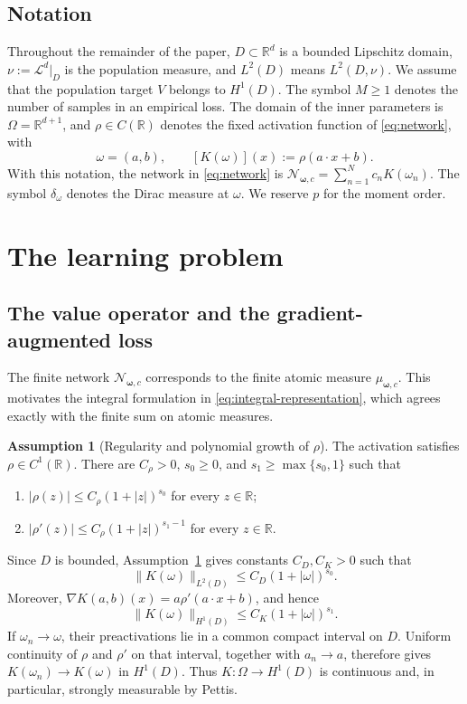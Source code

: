 \documentclass[11pt]{amsart}
\theoremstyle{definition}
\newtheorem{assumption}[theorem]{Assumption}
\theoremstyle{remark}
\begin{document}
\subsection*{Notation}
Throughout the remainder of the paper, $D\subset\mathbb R^d$ is a bounded
Lipschitz domain, $\nu:=\mathcal L^d|_D$ is the population measure,
and $L^2(D)$ means $L^2(D,\nu)$. We assume that the population target
$V$ belongs to $H^1(D)$. The symbol $M\ge1$ denotes the number of samples in
an empirical loss. The domain of the inner parameters is
$\Omega=\mathbb R^{d+1}$, and $\rho\in C(\mathbb R)$ denotes the fixed
activation function of \eqref{eq:network}, with
\begin{equation*}
	\omega=(a,b),\qquad [K(\omega)](x):=\rho(a\cdot x+b).
\end{equation*}
With this notation, the network in \eqref{eq:network} is
$\mathcal N_{\boldsymbol\omega,c}=\sum_{n=1}^Nc_nK(\omega_n)$.
The symbol $\delta_\omega$ denotes the Dirac measure at $\omega$. 
We reserve $p$ for the moment order.

\section{The learning problem}

\subsection{The value operator and the gradient-augmented loss}
The finite network $\mathcal N_{\boldsymbol\omega,c}$ corresponds to the
finite atomic measure $\mu_{\boldsymbol\omega,c}$. This motivates the integral
formulation in \eqref{eq:integral-representation}, which agrees exactly with the finite sum on atomic
measures.

\begin{assumption}[Regularity and polynomial growth of $\rho$]
\label{ass:value-growth}
The activation satisfies $\rho\in C^1(\mathbb R)$. There are
$C_\rho>0$, $s_0\ge0$, and $s_1\ge\max\{s_0,1\}$ such that
\begin{enumerate}
	\item $|\rho(z)| \le C_\rho (1 + |z|)^{s_0}$ for every $z \in \mathbb{R}$;
	\item $|\rho'(z)| \le C_\rho (1 + |z|)^{s_1-1}$ for every
	$z \in \mathbb{R}$.
\end{enumerate}
\end{assumption}
Since $D$ is bounded, Assumption~\ref{ass:value-growth} gives constants
$C_D,C_K>0$ such that
\begin{equation}
	\label{eq:atom-L2-growth}
	\|K(\omega)\|_{L^2(D)} \le C_D (1 + |\omega|)^{s_0}.
\end{equation}
Moreover,
$\nabla K(a,b)(x)=a\rho'(a\cdot x+b)$, and hence
\begin{equation}
	\label{eq:H1-growth}
	\|K(\omega)\|_{H^1(D)}
	\le C_K(1+|\omega|)^{s_1}.
\end{equation}
If $\omega_n\to\omega$, their preactivations lie in a common compact
interval on $D$. Uniform continuity of $\rho$ and $\rho'$ on that interval,
together with $a_n\to a$, therefore gives
$K(\omega_n)\to K(\omega)$ in $H^1(D)$. Thus
$K:\Omega\to H^1(D)$ is continuous and, in particular, strongly measurable by Pettis.
\end{document}
